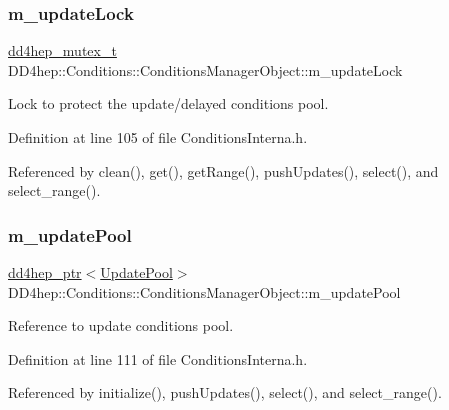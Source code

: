 \subsubsection{\texorpdfstring{m\+\_\+update\+Lock}{m\_updateLock}}
{\footnotesize\ttfamily \hyperlink{struct_d_d4hep_1_1dd4hep__mutex__t}{dd4hep\+\_\+mutex\+\_\+t} D\+D4hep\+::\+Conditions\+::\+Conditions\+Manager\+Object\+::m\+\_\+update\+Lock}



Lock to protect the update/delayed conditions pool. 



Definition at line 105 of file Conditions\+Interna.\+h.



Referenced by clean(), get(), get\+Range(), push\+Updates(), select(), and select\+\_\+range().

\hypertarget{class_d_d4hep_1_1_conditions_1_1_conditions_manager_object_a83ef3cf4c818d972d9c8720913c7525b}{}\label{class_d_d4hep_1_1_conditions_1_1_conditions_manager_object_a83ef3cf4c818d972d9c8720913c7525b} 
\subsubsection{\texorpdfstring{m\+\_\+update\+Pool}{m\_updatePool}}
{\footnotesize\ttfamily \hyperlink{class_d_d4hep_1_1dd4hep__ptr}{dd4hep\+\_\+ptr}$<$\hyperlink{class_d_d4hep_1_1_conditions_1_1_update_pool}{Update\+Pool}$>$ D\+D4hep\+::\+Conditions\+::\+Conditions\+Manager\+Object\+::m\+\_\+update\+Pool}



Reference to update conditions pool. 



Definition at line 111 of file Conditions\+Interna.\+h.



Referenced by initialize(), push\+Updates(), select(), and select\+\_\+range().

\hypertarget{class_d_d4hep_1_1_conditions_1_1_conditions_manager_object_a015a2e784bea5773c62513f6d24af753}{}\label{class_d_d4hep_1_1_conditions_1_1_conditions_manager_object_a015a2e784bea5773c62513f6d24af753} 
